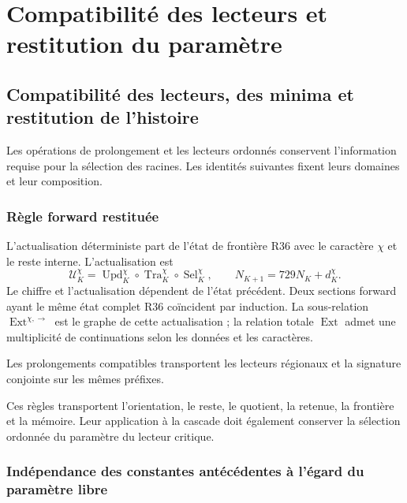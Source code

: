 \section{Compatibilité des lecteurs et restitution du paramètre}
\label{hmtfg:fragmento:compatibilidad-de-lectores-y-restitucion-del-parametro}

\subsection{Compatibilité des lecteurs, des minima et restitution de l’histoire}
\label{hmtfg:escalado:13}

Les opérations de prolongement et les lecteurs ordonnés conservent l’information requise pour la sélection des racines. Les identités suivantes fixent leurs domaines et leur composition.

\subsubsection{Règle forward restituée}
\label{hmtfg:escalado:13.1}

L’actualisation déterministe part de l’état de frontière R36 avec le caractère \(\chi\) et le reste interne. L’actualisation est
\begin{equation}
\mathcal U_K^\chi=
\operatorname{Upd}_K^\chi\circ
\operatorname{Tra}_K^\chi\circ
\operatorname{Sel}_K^\chi,
\qquad
N_{K+1}=729N_K+d_K^\chi.
\label{hmtfg:escalado:eq:26}
\end{equation}
Le chiffre et l’actualisation dépendent de l’état précédent. Deux sections forward ayant le même état complet R36 coïncident par induction. La sous-relation \(\operatorname{Ext}^{\chi,\rightarrow}\) est le graphe de cette actualisation ; la relation totale \(\operatorname{Ext}\) admet une multiplicité de continuations selon les données et les caractères.

Les prolongements compatibles transportent les lecteurs régionaux et la signature conjointe sur les mêmes préfixes.

Ces règles transportent l’orientation, le reste, le quotient, la retenue, la frontière et la mémoire. Leur application à la cascade doit également conserver la sélection ordonnée du paramètre du lecteur critique.

\subsubsection{Indépendance des constantes antécédentes à l’égard du paramètre libre}
\label{hmtfg:escalado:13.2}

